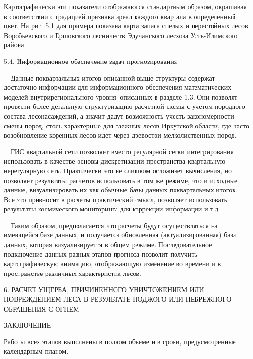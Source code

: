 \documentclass{report}
\begin{document}
Картографически эти показатели отображаются стандартным образом, окрашивая в соответствии с градацией признака ареал
каждого квартала в определенный цвет. На рис. 5.1 для примера показана карта запаса спелых и перестойных лесов
Воробьевского и Ершовского лесничеств Эдучанского лесхоза Усть-Илимского района. 

5.4. Информационное обеспечение задач прогнозирования

\ \ Данные поквартальных итогов описанной выше структуры содержат достаточно информации для информационного обеспечения
математических моделей внутрирегионального уровня, описанных в разделе 1.3. Они позволят провести более детальную
структуризацию расчетной схемы с учетом породного состава лесонасаждений, а значит дадут возможность учесть
закономерности смены пород, столь характерные для таежных лесов Иркутской области, где часто возобновление коренных
лесов идет через древостои мелколиственных пород. 

\ \  ГИС квартальной сети позволяет вместо регулярной сетки интегрирования использовать в качестве основы дискретизации
пространства квартальную нерегулярную сеть. Практически это не слишком осложняет вычисления, но позволяет результаты
расчетов использовать в том же режиме, что и исходные данные, визуализировать их как обычные базы данных поквартальных
итогов. Все это привносит в расчеты практический смысл, позволяет использовать результаты космического мониторинга для
коррекции информации и т.д. 

\ \ Таким образом, предполагается что расчеты будут осуществляться на имеющейся базе данных, и получается обновленная
(актуализированная) база данных, которая визуализируется в общем режиме. Последовательное подключение данных разных
этапов прогноза позволит получить картографическую анимацию, отображающую изменение во времени и в пространстве
различных характеристик лесов. 

6. РАСЧЕТ УЩЕРБА, ПРИЧИНЕННОГО УНИЧТОЖЕНИЕМ ИЛИ ПОВРЕЖДЕНИЕМ ЛЕСА В РЕЗУЛЬТАТЕ ПОДЖОГО ИЛИ НЕБРЕЖНОГО ОБРАЩЕНИЯ С ОГНЕМ

ЗАКЛЮЧЕНИЕ

Работы всех этапов выполнены в полном объеме и в сроки, предусмотренные календарным планом.
\end{document}
